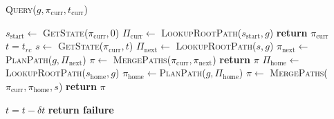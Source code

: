 \documentclass[letterpaper]{article} %
\begin{document}
\begin{algorithm}
\caption{\textsc{Query}($g, \pi_{\textrm{curr}},t_{\textrm{curr}}$)}\label{alg:1}
\begin{algorithmic}[1]
    \State $s_{\textrm{start}} \leftarrow$ \textsc{GetState}($\pi_{\textrm{curr}}, 0$) 
    \State $\Pi_{\textrm{curr}} \leftarrow$ \textsc{LookupRootPath}($s_{\textrm{start}},g$)
        \State \textbf{return} $\pi_{\textrm{curr}}$
    \EndIf
\State $t = t_{rc}$
    \State $s \leftarrow$ \textsc{GetState}($\pi_{\textrm{curr}}, t$)
    \State $\Pi_{\textrm{next}} \leftarrow$  \textsc{LookupRootPath}($s,g$)
        \State $\pi_{\textrm{next}} \leftarrow$\textsc{PlanPath}($g,\Pi_{\textrm{next}}$)
        \State $\pi \leftarrow$ \textsc{MergePaths}($\pi_{\textrm{curr}},\pi_{\textrm{next}}$)
        \State \textbf{return} $\pi$
    \EndIf
    {\color{blue}
    \State $\Pi_{\textrm{home}} \leftarrow$ \textsc{LookupRootPath}($s_{\textrm{home}},g$)
            \State $\pi_{\textrm{home}} \leftarrow$\textsc{PlanPath}($g,\Pi_{\textrm{home}}$)
            \State $\pi \leftarrow$ \textsc{MergePaths}($\pi_{\textrm{curr}},\pi_{\textrm{home}}, s$)
            \State \textbf{return} $\pi$
        \EndIf
    \EndIf
    }

    \State $t = t - \delta t$
\EndWhile
\State \textbf{return failure}
\end{algorithmic}
\end{algorithm}
\end{document}
